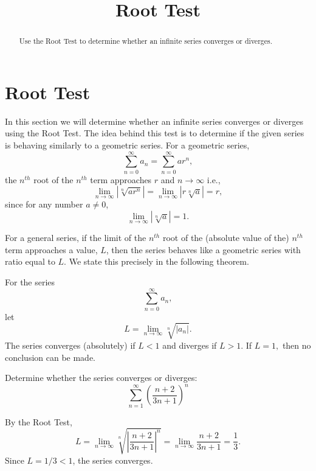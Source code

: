 \documentclass{ximera}
\title{Root Test}
\begin{document}
\begin{abstract}
Use the Root Test to determine whether an infinite series converges or diverges.
\end{abstract}

\maketitle

\section{Root Test}

In this section we will determine whether an infinite series converges or diverges using the Root Test. 
The idea behind this test is to determine if the given series is behaving similarly to a geometric series.
For a geometric series, 
\[
\sum_{n=0}^\infty a_n = \sum_{n=0}^\infty ar^n,
\]
the $n^{th}$ root of the $n^{th}$ term approaches $r$ and $n \to \infty$ i.e., 
\[
\lim_{n \to \infty} \left|\sqrt[n]{ar^n}\right| = \lim_{n \to \infty} \left|r\sqrt[n]{a}\right| = r,
\]
since for any number $a \neq 0$, 
\[
\lim_{n \to \infty}  \left|\sqrt[n]{a}\right| = 1.
\]


For a general series, if the limit of the $n^{th}$ root of the (absolute value of the) $n^{th}$ term
approaches a value, $L$, then the series behaves like a geometric series with ratio equal to $L$.
We state this precisely in the following theorem.

\begin{theorem}
For the series
\[
\sum_{n=0}^\infty a_n,
\]
let
\[
L = \lim_{n \to \infty} \sqrt[n]{\left|{a_n}\right|}.
\]
The series converges (absolutely) if $L < 1$ and diverges if $L>1$. 
If $L = 1,$ then no conclusion can be made.

\end{theorem}






\begin{example}[example 1]
Determine whether the series converges or diverges:
\[
\sum_{n=1}^\infty \left(\frac{n+ 2}{3n+1}\right)^n
\]


By the Root Test,
\[
L =  \lim_{n \to \infty} \sqrt[n]{\left|\frac{n+ 2}{3n+1}\right|^n} = \lim_{n \to \infty} \frac{n+ 2}{3n+1} = \frac13.
\]
Since $L = 1/3 < 1$, the series converges.

\end{example}





\begin{center}
\begin{foldable}
\end{foldable}
\end{center}
\end{document}
